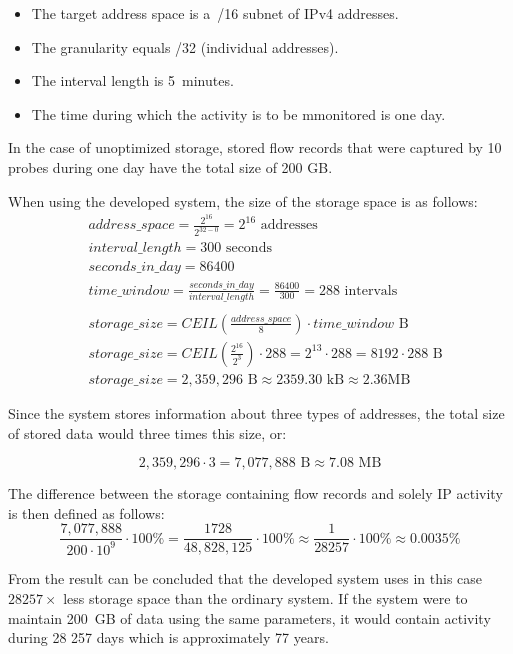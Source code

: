 \begin{itemize}
   \item The target address space is a~/16 subnet of IPv4 addresses.
   \item The granularity equals /32 (individual addresses).
   \item The interval length is 5~minutes.
   \item The time during which the activity is to be mmonitored is one day.
\end{itemize}

In the case of unoptimized storage, stored flow records that were captured by
10 probes during one day have the total size of 200 GB.

When using the developed system, the size of the storage space is as follows:
\begin{align*}
   &address\_space = \frac{2^{16}}{2^{32-0}} = 2^{16} \mbox{ addresses} \\
   &interval\_length = 300 \mbox{ seconds}\\
   &seconds\_in\_day = 86400 \\
   &time\_window = \frac{seconds\_in\_day}{interval\_length} = \frac{86400}{300} = 288 \mbox{ intervals}\\
   \\
   &storage\_size = CEIL(\frac{address\_space}{8}) \cdot time\_window \mbox{ B}\\
   &storage\_size = CEIL(\frac{2^{16}}{2^3}) \cdot 288 = 2^{13} \cdot 288 = 8192 \cdot 288 \mbox{ B}\\
   &storage\_size = 2,359,296 \mbox{ B} \approx 2359.30 \mbox{ kB} \approx 2.36 \mbox{MB}
\end{align*}

Since the system stores information about three types of addresses, the total size
of stored data would three times this size, or:

\begin{equation}
   2,359,296 \cdot 3 = 7,077,888 \mbox{ B} \approx 7.08 \mbox{ MB}
\end{equation} 

The difference between the storage containing flow records and solely
IP activity is then defined as follows:
\begin{equation}
\frac{7,077,888}{200\cdot10^{9}} \cdot 100\% = \frac{1728}{48,828,125} \cdot 100\% \approx \frac{1}{28257} \cdot 100\% \approx 0.0035\%
\end{equation}

From the result can be concluded that the developed system uses in this case
$28257\times$ less storage space than the ordinary system. If the system
were to maintain 200\ GB of data using the same parameters, it would contain activity
during 28 257 days which is approximately 77 years.

